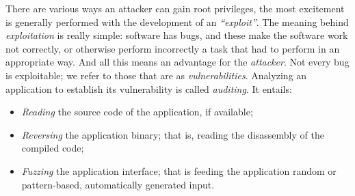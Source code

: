 \documentclass{masterthesis}
\begin{document}
There are various ways an attacker can gain root privileges, the most excitement is generally performed with the development of an \emph{``exploit''}.
The meaning behind \emph{exploitation} is really simple: software has bugs, and these make the software work not correctly, or otherwise perform incorrectly a task that had to perform in an appropriate way.
And all this means an advantage for the \emph{attacker}. Not every bug is exploitable; we refer to those that are as \emph{vulnerabilities}.
Analyzing an application to establish its vulnerability is called \emph{auditing}. It entails:
\begin{itemize}
\item \emph{Reading} the source code of the application, if available;
\item \emph{Reversing} the application binary; that is, reading the disassembly of the compiled code;
\item \emph{Fuzzing} the application interface; that is feeding the application random or pattern-based, automatically generated input.
\end{itemize}
\end{document}

